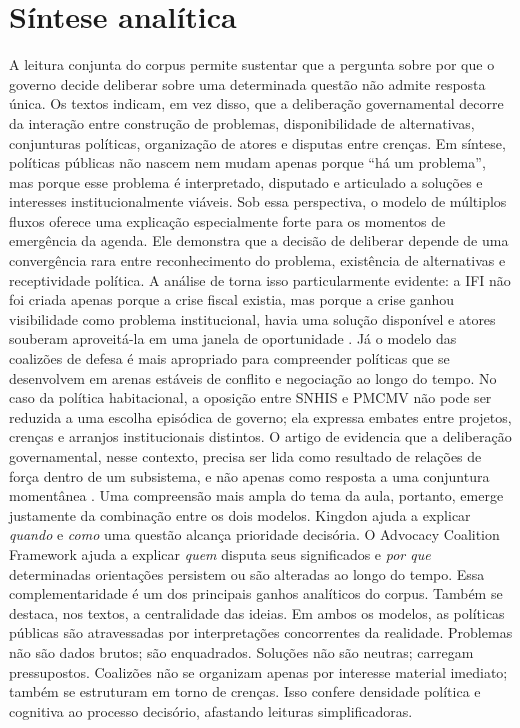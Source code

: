 \documentclass[12pt,a4paper]{article}
\begin{document}
\section{Síntese analítica}
\label{sec:org1fd8206}
A leitura conjunta do corpus permite sustentar que a pergunta sobre por que o governo decide deliberar sobre uma determinada questão não admite resposta única. Os textos indicam, em vez disso, que a deliberação governamental decorre da interação entre construção de problemas, disponibilidade de alternativas, conjunturas políticas, organização de atores e disputas entre crenças. Em síntese, políticas públicas não nascem nem mudam apenas porque “há um problema”, mas porque esse problema é interpretado, disputado e articulado a soluções e interesses institucionalmente viáveis.
Sob essa perspectiva, o modelo de múltiplos fluxos oferece uma explicação especialmente forte para os momentos de emergência da agenda. Ele demonstra que a decisão de deliberar depende de uma convergência rara entre reconhecimento do problema, existência de alternativas e receptividade política. A análise de \textcite{bijos2024ifi} torna isso particularmente evidente: a IFI não foi criada apenas porque a crise fiscal existia, mas porque a crise ganhou visibilidade como problema institucional, havia uma solução disponível e atores souberam aproveitá-la em uma janela de oportunidade \autocites{bijos2024ifi}{capella2022multiplos}.
Já o modelo das coalizões de defesa é mais apropriado para compreender políticas que se desenvolvem em arenas estáveis de conflito e negociação ao longo do tempo. No caso da política habitacional, a oposição entre SNHIS e PMCMV não pode ser reduzida a uma escolha episódica de governo; ela expressa embates entre projetos, crenças e arranjos institucionais distintos. O artigo de \textcite{ferreira2019habitacional} evidencia que a deliberação governamental, nesse contexto, precisa ser lida como resultado de relações de força dentro de um subsistema, e não apenas como resposta a uma conjuntura momentânea \autocites{ferreira2019habitacional}{araujoSilva2022coalizoes}.
Uma compreensão mais ampla do tema da aula, portanto, emerge justamente da combinação entre os dois modelos. Kingdon ajuda a explicar \emph{quando} e \emph{como} uma questão alcança prioridade decisória. O Advocacy Coalition Framework ajuda a explicar \emph{quem} disputa seus significados e \emph{por que} determinadas orientações persistem ou são alteradas ao longo do tempo. Essa complementaridade é um dos principais ganhos analíticos do corpus.
Também se destaca, nos textos, a centralidade das ideias. Em ambos os modelos, as políticas públicas são atravessadas por interpretações concorrentes da realidade. Problemas não são dados brutos; são enquadrados. Soluções não são neutras; carregam pressupostos. Coalizões não se organizam apenas por interesse material imediato; também se estruturam em torno de crenças. Isso confere densidade política e cognitiva ao processo decisório, afastando leituras simplificadoras.
\end{document}
